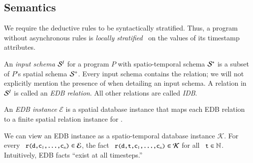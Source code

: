


\subsection{Semantics}
\label{sec:semantics}
We require the deductive rules to be syntactically stratified.  Thus, a \lang program without asynchronous rules is {\em locally stratified}~\cite{local-strat} on the values of its timestamp attributes.


An {\em input schema} $\ischema$ for a \lang program $P$ with spatio-temporal schema $\stschema$ is a subset of $P$'s spatial schema $\sschema$.  Every input schema contains the  relation; we will not explicitly mention the presence of  when detailing an input schema.  A relation in $\ischema$ is called an {\em EDB relation}.  All other relations are called {\em IDB}.

An {\em EDB instance} $\mathcal{E}$ is a spatial database instance that maps each EDB relation  to a finite spatial relation instance for .

We can view an EDB instance as a spatio-temporal database instance $\mathcal{K}$.  For every $\dedalus{r(d,c\sub{1},\ldots,c\sub{n})} \in \mathcal{E}$, the fact $\dedalus{r(d,t,c\sub{1},\ldots,c\sub{n})} \in \mathcal{K}$ for all $\dedalus{t} \in \mathbb{N}$.  Intuitively, EDB facts ``exist at all timesteps.''

